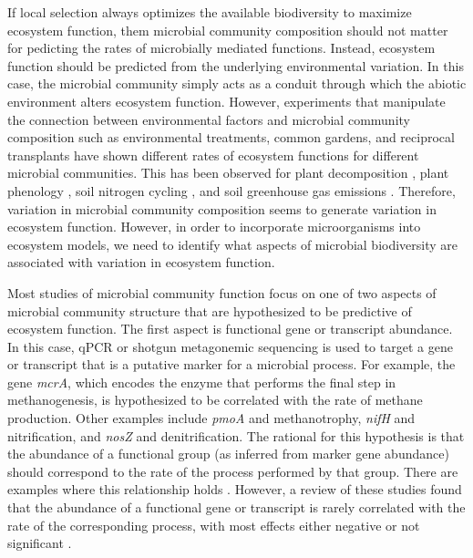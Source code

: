 \documentclass{article}
\begin{document}
If local selection always optimizes the available biodiversity to maximize
ecosystem function, them microbial community composition should not matter for
pedicting the rates of microbially mediated functions. Instead, ecosystem function
should be predicted from the underlying environmental variation. In this case,
the microbial community simply acts as a conduit through which the abiotic
environment alters ecosystem function. However, experiments that manipulate the
connection between environmental factors and microbial community composition
such as environmental treatments, common gardens, and reciprocal transplants
have shown different rates of ecosystem functions for different microbial
communities. This has been observed for plant decomposition
\citep{strickland2009}, plant phenology \citep{panke-buisse2015}, soil nitrogen
cycling \citep{balser2005}, and soil greenhouse gas emissions
\citep{cavigelli2000}. Therefore, variation in microbial community composition
seems to generate variation in ecosystem function. However, in order to
incorporate microorganisms into ecosystem models, we need to identify what
aspects of microbial biodiversity are associated with variation in ecosystem
function.

Most studies of microbial community function focus on one of two aspects of
microbial community structure that are hypothesized to be predictive of
ecosystem function. The first aspect is functional gene or transcript abundance.
In this case, qPCR or shotgun metagonemic sequencing is used to target a gene
or transcript that is a putative marker for a microbial process. For example,
the gene \textit{mcrA}, which encodes the enzyme that performs the final step in
methanogenesis, is hypothesized to be correlated with the rate of
methane production. Other examples include \textit{pmoA} and methanotrophy,
\textit{nifH} and nitrification, and \textit{nosZ} and denitrification. The
rational for this hypothesis is that the abundance of a functional group (as
inferred from marker gene abundance) should correspond to the rate of the
process performed by that group. There are examples where this relationship
holds \citep{freitag2009, freitag2010, schnyder2018}. However, a review of these
studies found that the abundance of a functional gene or transcript is rarely
correlated with the rate of the corresponding process, with most effects either
negative or not significant \citep{rocca2015}.
\end{document}
